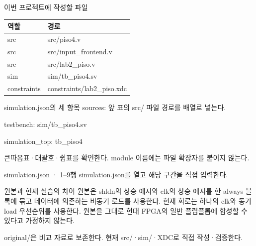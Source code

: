 \begin{frame}{이번 프로젝트에 작성할 파일}
\small
\begin{center}\renewcommand{\arraystretch}{1.55}\begin{tabular}{ll}
역할 & 경로\\\hline
src & src/piso4.v\\
src & src/input\_frontend.v\\
src & src/lab2\_piso.v\\
sim & sim/tb\_piso4.sv\\
constraints & constraints/lab2\_piso.xdc\\
\end{tabular}\end{center}
\end{frame}

\begin{frame}{simulation.json의 세 항목}
\small
sources: 앞 표의 src/ 파일 경로를 배열로 넣는다.\par\vspace{0.26cm}testbench: sim/tb\_piso4.sv\par\vspace{0.26cm}simulation\_top: tb\_piso4\par\vspace{0.26cm}큰따옴표·대괄호·쉼표를 확인한다. module 이름에는 파일 확장자를 붙이지 않는다.\par
\end{frame}

\begin{frame}{simulation.json · 1–9행}
\small
simulation.json를 열고 해당 구간을 직접 입력한다.\par\vspace{0.4cm}\par\vspace{0.4cm}
\end{frame}

\begin{frame}{원본과 현재 실습의 차이}
\small
원본은 shldn의 상승 에지와 clk의 상승 에지를 한 always 블록에 묶고 데이터에 의존하는 비동기 로드를 사용한다. 현재 회로는 하나의 clk와 동기 load 우선순위를 사용한다. 원본을 그대로 현대 FPGA의 일반 플립플롭에 합성할 수 있다고 가정하지 않는다.\par\vspace{0.26cm}original/은 비교 자료로 보존한다. 현재 src/·sim/·XDC로 직접 작성·검증한다.\par
\end{frame}

